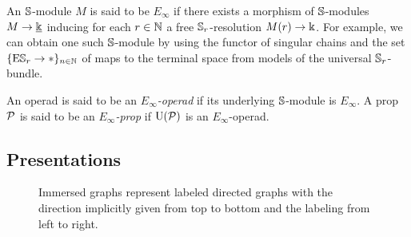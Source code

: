 An $\mathbb{S}$-module $M$ is said to be $E_\infty$ if there exists a morphism of $\mathbb{S}$-modules $M \to \underline{\Bbbk}$ inducing for each $r \in \mathbb{N}$ a free $\mathbb{S}_r$-resolution $M(r) \to \Bbbk$.
For example, we can obtain one such $\mathbb{S}$-module by using the functor of singular chains and the set $\{\mathrm{E} \mathbb{S}_r \to \ast\}_{n \in \mathbb{N}}$ of maps to the terminal space from models of the universal $\mathbb{S}_r$-bundle.

An operad is said to be an \textit{$E_\infty$-operad} if its underlying $\mathbb{S}$-module is $E_\infty$.
A prop $\mathcal{P}$ is said to be an \textit{$E_\infty$-prop} if $\operatorname{U}(\mathcal{P})$ is an $E_\infty$-operad.

\subsection{Presentations} \label{ss:presentation}

\begin{figure}
	
	\caption{Immersed graphs represent labeled directed graphs with the direction implicitly given from top to bottom and the labeling from left to right.}
	\label{f:immersion}
\end{figure}

